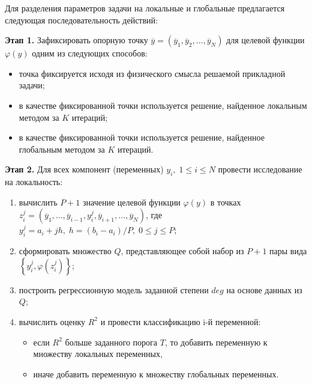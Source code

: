 \documentclass[11pt, oneside, a4paper]{article}
\begin{document}
Для разделения параметров задачи на локальные и глобальные предлагается следующая последовательность действий:

\textbf{Этап 1.} Зафиксировать опорную точку $\overline{y} = (\overline{y}_1, \overline{y}_2,...,\overline{y}_N)$ для целевой функции $\varphi(y)$ одним из следующих способов:
\begin{itemize}
\item точка фиксируется исходя из физического смысла решаемой прикладной задачи;
\item в качестве фиксированной точки используется решение, найденное локальным методом за $K$ итераций;
\item в качестве фиксированной точки используется решение, найденное глобальным методом за $K$ итераций.
\end{itemize}

\textbf{Этап 2.} Для всех компонент (переменных) $y_i, \; 1\leq i \leq N$ провести исследование на локальность:
\begin{enumerate}
\item вычислить $P+1$ значение целевой функции $\varphi(y)$ в точках $z_i^j = (\overline{y}_1,...,\overline{y}_{i-1},y_i^j,\overline{y}_{i+1},...,\overline{y}_N)$, где
$y_i^j =  a_i + jh, \; h=(b_i-a_i)/P, \; 0\leq j \leq P$;
\item сформировать множество $Q$, представляющее собой набор из $P+1$ пары вида $\left\{y_i^j, \varphi(z_i^j)\right\} $;
\item построить регрессионную модель заданной степени $deg$ на основе данных из $Q$;
\item вычислить оценку $R^2$ и провести классификацию i-й переменной:
\begin{itemize}
\item если $R^2$ больше заданного порога $T$, то добавить переменную к множеству локальных переменных,
\item иначе добавить переменную к множеству глобальных переменных.
\end{itemize}
\end{enumerate}
\end{document}
